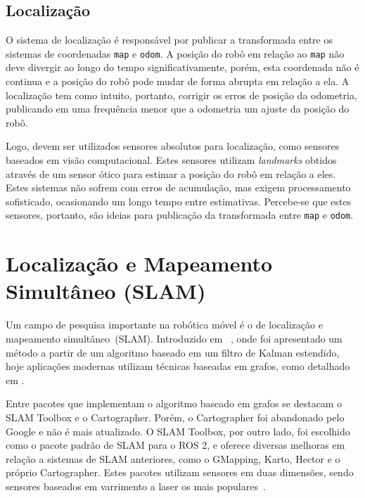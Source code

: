 \documentclass[repeatfields,xlists,xpacks,oneside,yearsonly]{ufrgscca}
\begin{document}

\subsection{Localização}

O sistema de localização é responsável por publicar a transformada
entre os sistemas de coordenadas \texttt{map} e \texttt{odom}. A
posição do robô em relação ao \texttt{map} não deve divergir ao longo
do tempo significativamente, porém, esta coordenada não é continua e
a posição do robô pode mudar de forma abrupta em relação a ela. A
localização tem como intuito, portanto, corrigir os erros de posição
da odometria, publicando em uma frequência menor que a odometria um
ajuste da posição do robô.

Logo, devem ser utilizados sensores absolutos para localização, como
sensores baseados em visão computacional. Estes sensores utilizam
\textit{landmarks} obtidos através de um sensor ótico para estimar a
posição do robô em relação a eles. Estes sistemas não sofrem com
erros de acumulação, mas exigem processamento sofisticado,
ocasionando um longo tempo entre estimativas. Percebe-se que estes
sensores, portanto, são ideias para publicação da transformada entre
\texttt{map} e \texttt{odom}.

\section{Localização e Mapeamento Simultâneo (SLAM)}

Um campo de pesquisa importante na robótica móvel é o de localização
e mapeamento simultâneo~(SLAM). Introduzido em
~\textcite{slam_intro}, onde foi apresentado um método a partir de um
algoritmo baseado em um filtro de Kalman estendido, hoje aplicações
modernas utilizam técnicas baseadas em grafos, como detalhado em
\textcite{graph_slam}.

Entre pacotes que implementam o algoritmo baseado em grafos se
destacam o SLAM Toolbox e o Cartographer. Porém, o Cartographer foi
abandonado pelo Google e não é mais atualizado. O SLAM Toolbox, por
outro lado, foi escolhido como o pacote padrão de SLAM para o ROS 2,
e oferece diversas melhoras em relação a sistemas de SLAM anteriores,
como o GMapping, Karto, Hector e o próprio Cartographer. Estes
pacotes utilizam sensores em duas dimensões, sendo sensores baseados
em varrimento a laser os mais populares~\cite{SensorAndSLAM}.
\end{document}
